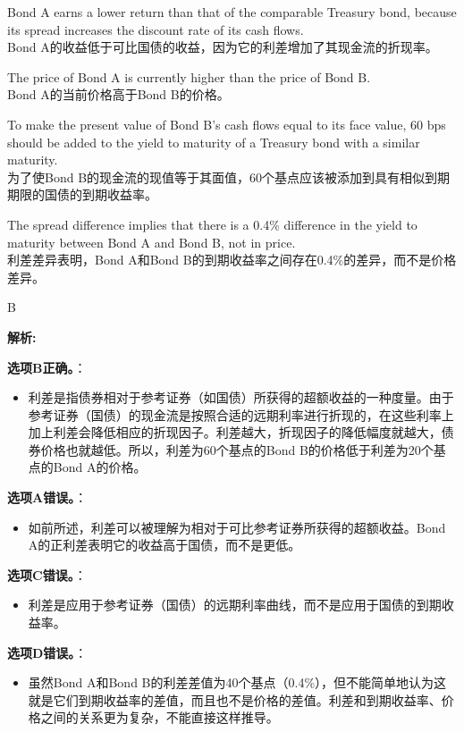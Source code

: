 \documentclass{article}
\newenvironment{explanation}
{\textbf{解析:}\par}
{\par}
\begin{document}
    \begin{choices}
        \item Bond A earns a lower return than that of the comparable Treasury bond, because its spread increases the discount rate of its cash flows.\\
        Bond A的收益低于可比国债的收益，因为它的利差增加了其现金流的折现率。
        \item The price of Bond A is currently higher than the price of Bond B.\\
        Bond A的当前价格高于Bond B的价格。
        \item To make the present value of Bond B’s cash flows equal to its face value, 60 bps should be added to the yield to maturity of a Treasury bond with a similar maturity.\\
        为了使Bond B的现金流的现值等于其面值，60个基点应该被添加到具有相似到期期限的国债的到期收益率。
        \item The spread difference implies that there is a 0.4\% difference in the yield to maturity between Bond A and Bond B, not in price.\\
        利差差异表明，Bond A和Bond B的到期收益率之间存在0.4\%的差异，而不是价格差异。
    \end{choices}
    
    \begin{correctanswer}
        B
    \end{correctanswer}
    
    \begin{explanation}
    \textbf{选项B正确。}：
    \begin{itemize}
    \item 利差是指债券相对于参考证券（如国债）所获得的超额收益的一种度量。由于参考证券（国债）的现金流是按照合适的远期利率进行折现的，在这些利率上加上利差会降低相应的折现因子。利差越大，折现因子的降低幅度就越大，债券价格也就越低。所以，利差为60个基点的Bond B的价格低于利差为20个基点的Bond A的价格。
    \end{itemize}
    \textbf{选项A错误。}：
    \begin{itemize}
    \item 如前所述，利差可以被理解为相对于可比参考证券所获得的超额收益。Bond A的正利差表明它的收益高于国债，而不是更低。
    \end{itemize}
    \textbf{选项C错误。}：
    \begin{itemize}
    \item 利差是应用于参考证券（国债）的远期利率曲线，而不是应用于国债的到期收益率。
    \end{itemize}
    \textbf{选项D错误。}：
    \begin{itemize}
    \item 虽然Bond A和Bond B的利差差值为40个基点（0.4\%），但不能简单地认为这就是它们到期收益率的差值，而且也不是价格的差值。利差和到期收益率、价格之间的关系更为复杂，不能直接这样推导。
    \end{itemize}
    \end{explanation}
    
\end{document}
